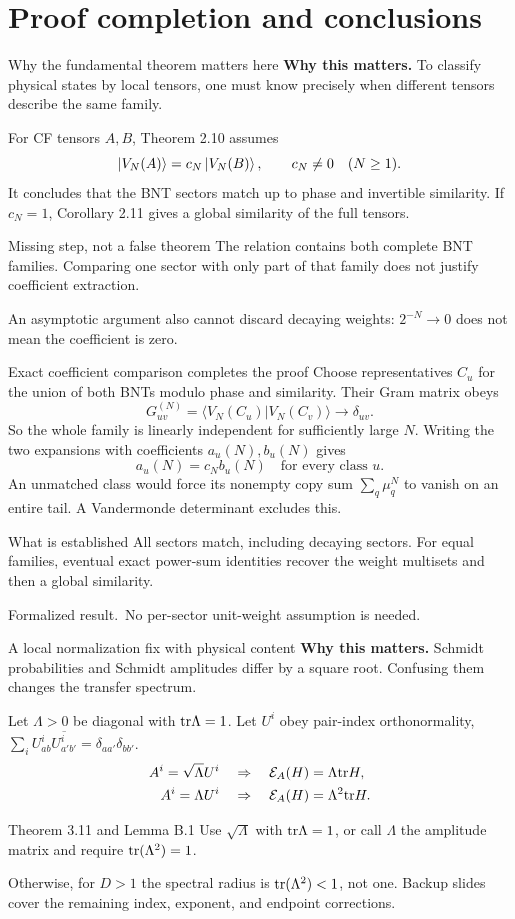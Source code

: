 \documentclass[aspectratio=169,14pt]{beamer}
\newcommand{\E}{\mathcal E}
\newcommand{\why}[1]{\textcolor{amber}{\textbf{Why this matters.}} #1\par\medskip}
\newcommand{\verified}{\textcolor{mintgreen}{Formalized result.}}
\begin{document}
\section{Proof completion and conclusions}
\begin{frame}{Why the fundamental theorem matters here}
\why{To classify physical states by local tensors, one must know precisely when different tensors describe the same family.}
For CF tensors $A,B$, Theorem 2.10 assumes
\[
 \ket{V_N(A)}=c_N\ket{V_N(B)},\qquad c_N\ne0\quad(N\geq1).
\]
It concludes that the BNT sectors match up to phase and invertible similarity. If $c_N=1$, Corollary 2.11 gives a global similarity of the full tensors.
\begin{block}{Missing step, not a false theorem}
The relation contains both complete BNT families. Comparing one sector with only part of that family does not justify coefficient extraction.
\end{block}
An asymptotic argument also cannot discard decaying weights: $2^{-N}\to0$ does not mean the coefficient is zero.
\end{frame}
\begin{frame}{Exact coefficient comparison completes the proof}
Choose representatives $C_u$ for the union of both BNTs modulo phase and similarity. Their Gram matrix obeys
\[
 G_{uv}^{(N)}=\langle V_N(C_u)|V_N(C_v)\rangle\longrightarrow\delta_{uv}.
\]
So the whole family is linearly independent for sufficiently large $N$.
Writing the two expansions with coefficients $a_u(N),b_u(N)$ gives
\[
 a_u(N)=c_Nb_u(N)\quad\text{for every class }u.
\]
An unmatched class would force its nonempty copy sum $\sum_q\mu_q^N$ to vanish on an entire tail. A Vandermonde determinant excludes this.
\begin{block}{What is established}
All sectors match, including decaying sectors. For equal families, eventual exact power-sum identities recover the weight multisets and then a global similarity.
\end{block}
\verified\ No per-sector unit-weight assumption is needed.
\end{frame}
\begin{frame}{A local normalization fix with physical content}
\why{Schmidt probabilities and Schmidt amplitudes differ by a square root. Confusing them changes the transfer spectrum.}
Let $\Lambda>0$ be diagonal with $\mathrm{tr}\Lambda=1$. Let $U^i$ obey pair-index orthonormality,
$\sum_i U^i_{ab}\overline{U^i_{a'b'}}=\delta_{aa'}\delta_{bb'}$.
\begin{align*}
 A^i=\sqrt\Lambda U^i&\quad\Rightarrow\quad\E_A(H)=\Lambda\tr H,\\
 A^i=\Lambda U^i&\quad\Rightarrow\quad\E_A(H)=\Lambda^2\tr H.
\end{align*}
\begin{block}{Theorem 3.11 and Lemma B.1}
Use $\sqrt\Lambda$ with $\mathrm{tr}\Lambda=1$, or call $\Lambda$ the amplitude matrix and require $\mathrm{tr}(\Lambda^2)=1$.
\end{block}
Otherwise, for $D>1$ the spectral radius is $\mathrm{tr}(\Lambda^2)<1$, not one. Backup slides cover the remaining index, exponent, and endpoint corrections.
\end{frame}
\end{document}
